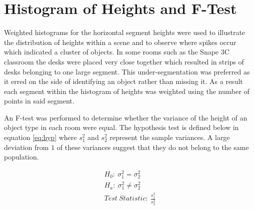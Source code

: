 \section{Histogram of Heights and F-Test}
Weighted histograms for the horizontal segment heights were used to illustrate the distribution of heights within a scene and to observe where spikes occur which indicated a cluster of objects. In some rooms such as the Snape 3C classroom the desks were placed very close together which resulted in strips of desks belonging to one large segment. This under-segmentation was preferred as it erred on the side of identifying an object rather than missing it. As a result each segment within the histogram of heights was weighted using the number of points in said segment. 

An F-test was performed to determine whether the variance of the height of an object type in each room were equal. The hypothesis test is defined below in equation \ref{eq:hyp} where $s^2_1$ and $s^2_2$ represent the sample variances. A large deviation from $1$ of these variances suggest that they do not belong to the same population. 

\begin{equation}\label{eq:hyp}
\begin{split}
H_0: \ \sigma^2_1 = \sigma^2_2 \\
H_a: \ \sigma^2_1 \neq \sigma^2_2 \\
Test \ Statistic: \ \frac{s^2_1}{s^2_2}
\end{split}
\end{equation}